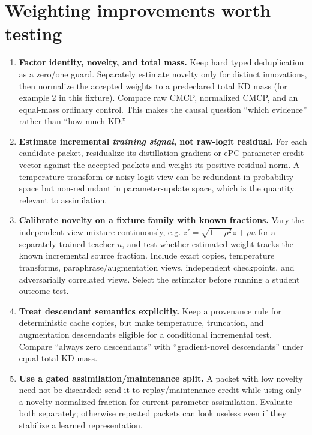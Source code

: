 \documentclass[10pt]{article}
\begin{document}
\section*{Weighting improvements worth testing}

\begin{enumerate}
\item \textbf{Factor identity, novelty, and total mass.} Keep hard typed
deduplication as a zero/one guard. Separately estimate novelty only for
distinct innovations, then normalize the accepted weights to a predeclared
total KD mass (for example 2 in this fixture). Compare raw CMCP, normalized
CMCP, and an equal-mass ordinary control. This makes the causal question
``which evidence'' rather than ``how much KD.''

\item \textbf{Estimate incremental \emph{training signal}, not raw-logit
residual.} For each candidate packet, residualize its distillation gradient or
ePC parameter-credit vector against the accepted packets and weight its
positive residual norm. A temperature transform or noisy logit view can be
redundant in probability space but non-redundant in parameter-update space,
which is the quantity relevant to assimilation.

\item \textbf{Calibrate novelty on a fixture family with known fractions.}
Vary the independent-view mixture continuously, e.g. $z'=\sqrt{1-\rho^2}z+
\rho u$ for a separately trained teacher $u$, and test whether estimated
weight tracks the known incremental source fraction. Include exact copies,
temperature transforms, paraphrase/augmentation views, independent
checkpoints, and adversarially correlated views. Select the estimator before
running a student outcome test.

\item \textbf{Treat descendant semantics explicitly.} Keep a provenance
rule for deterministic cache copies, but make temperature, truncation, and
augmentation descendants eligible for a conditional incremental test. Compare
``always zero descendants'' with ``gradient-novel descendants'' under equal
total KD mass.

\item \textbf{Use a gated assimilation/maintenance split.} A packet with
low novelty need not be discarded: send it to replay/maintenance credit while
using only a novelty-normalized fraction for current parameter assimilation.
Evaluate both separately; otherwise repeated packets can look useless even if
they stabilize a learned representation.
\end{enumerate}
\end{document}
